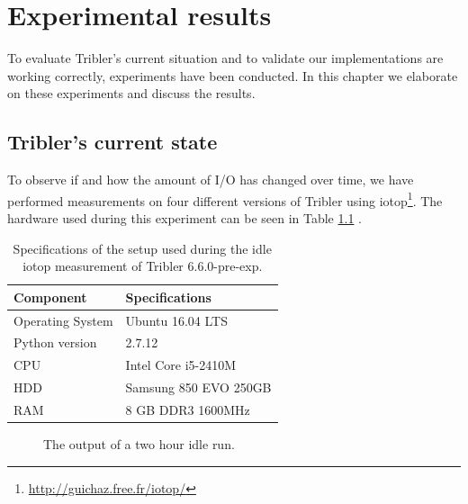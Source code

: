 \chapter{Experimental results}
\label{cpt:experiments}

To evaluate Tribler's current situation and to validate our implementations are working correctly, experiments have been conducted.
In this chapter we elaborate on these experiments and discuss the results. 

\section{Tribler's current state}
To observe if and how the amount of I/O has changed over time, we have performed measurements on four different versions of Tribler using iotop\footnote{\url{http://guichaz.free.fr/iotop/}}.
The hardware used during this experiment can be seen in Table \ref{table:tribler_idle} .

\begin{table}[h]
	\centering
	\begin{tabular}{l|l}
		\textbf{Component} 	& \textbf{Specifications} \\ \hline
		Operating System   	& Ubuntu 16.04 LTS \\
		Python version		& 2.7.12 \\
		CPU					& Intel Core i5-2410M \\ 
		HDD					& Samsung 850 EVO 250GB  \\ 
		RAM					& 8 GB DDR3 1600MHz \\
	\end{tabular}
	\caption{Specifications of the setup used during the idle iotop measurement of Tribler 6.6.0-pre-exp.}
	\label{table:tribler_idle}
\end{table}

\begin{figure}[h]
	\caption{The output of a two hour idle run.}
	\label{fig:htop_io_idle_run}
\end{figure} 

